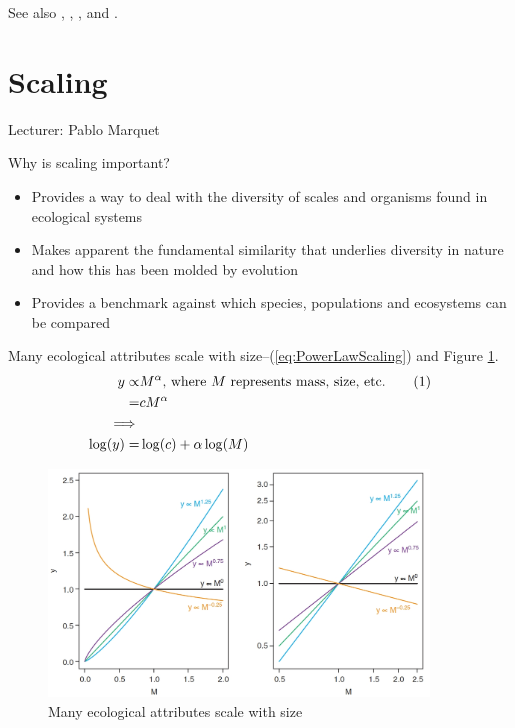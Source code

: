 \documentclass[]{article}
\newcommand\numberthis{\addtocounter{equation}{1}\tag{\theequation}}
\begin{document}
See also \cite{mitchell1998introduction}, \cite{eiben2003introduction}, \cite{forrest1993genetic}, and \cite{ma2014novo}.



\section{Scaling}

Lecturer: Pablo Marquet

Why is scaling important?

\begin{itemize}
	\item Provides a way to deal with the diversity of scales and
	organisms found in ecological systems
	\item Makes apparent the fundamental similarity that
	underlies diversity in nature and how this has been
	molded by evolution
	\item Provides a benchmark against which species,
	populations and ecosystems can be compared
\end{itemize}

Many ecological attributes scale with size--(\ref{eq:PowerLawScaling}) and Figure \ref{fig:PowerLawScaling}.
\begin{align*}
	y \propto& M^{\alpha}\text{, where $M$ represents mass, size, etc.}\numberthis\label{eq:PowerLawScaling}\\
	=& c M^{\alpha}\\
	\implies&\\
	\log(y)=&\log(c) + \alpha \log(M)
\end{align*}

\begin{figure}[H]
	\caption{Many ecological attributes scale with size}\label{fig:PowerLawScaling}
	\includegraphics[width=0.9\textwidth]{PowerLawScaling}
\end{figure}
\end{document}

